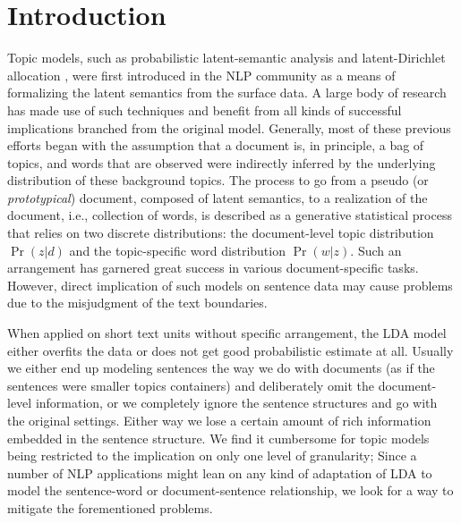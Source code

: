 \begin{abstract}
\end{abstract}

\section{Introduction} \label{s:introduction}

Topic models, such as probabilistic latent-semantic analysis
\cite{hofmann1999probabilistic} and latent-Dirichlet allocation
\cite{blei2003latent}, were first introduced in the NLP community as a means of
formalizing the latent semantics from the surface data.  A large body of
research has made use of such techniques and benefit from all kinds of
successful implications branched from the original model.  Generally, most of
these previous efforts began with the assumption that a document is, in
principle, a bag of topics, and words that are observed were indirectly
inferred by the underlying distribution of these background topics.  The
process to go from a pseudo (or {\it prototypical}) document, composed of
latent semantics, to a realization of the document, i.e., collection of words,
is described as a generative statistical process that relies on two discrete
distributions: the document-level topic distribution $\Pr(z|d)$ and the
topic-specific word distribution $\Pr(w|z)$.  Such an arrangement has garnered
great success in various document-specific tasks.  However, direct implication
of such models on sentence data may cause problems due to the misjudgment of
the text boundaries.  

When applied on short text units without specific arrangement, the LDA model
either overfits the data or does not get good probabilistic estimate at all.
Usually we either end up modeling sentences the way we do with documents (as if
the sentences were smaller topics containers) and deliberately omit the
document-level information, or we completely ignore the sentence structures and
go with the original settings.  Either way we lose a certain amount of rich
information embedded in the sentence structure.  We find it cumbersome for
topic models being restricted to the implication on only one level of
granularity; Since a number of NLP applications might lean on any kind of
adaptation of LDA to model the sentence-word or document-sentence relationship,
we look for a way to mitigate the forementioned problems.

